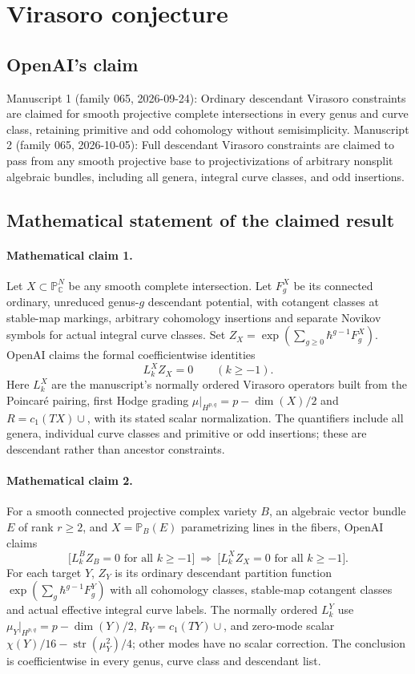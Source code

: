 \documentclass[11pt]{article}
\begin{document}
\section*{Virasoro conjecture}

\subsection{OpenAI's claim}
Manuscript 1 (family 065, 2026-09-24): Ordinary descendant Virasoro constraints are claimed for smooth projective complete intersections in every genus and curve class, retaining primitive and odd cohomology without semisimplicity. Manuscript 2 (family 065, 2026-10-05): Full descendant Virasoro constraints are claimed to pass from any smooth projective base to projectivizations of arbitrary nonsplit algebraic bundles, including all genera, integral curve classes, and odd insertions.

\subsection{Mathematical statement of the claimed result}
\paragraph{Mathematical claim 1.} Let $X\subset\mathbb P^N_{\mathbb C}$ be any smooth complete intersection. Let $F_g^X$ be its connected ordinary, unreduced genus-$g$ descendant potential, with cotangent classes at stable-map markings, arbitrary cohomology insertions and separate Novikov symbols for actual integral curve classes. Set $Z_X=\exp(\sum_{g\ge0}\hbar^{g-1}F_g^X)$. OpenAI claims the formal coefficientwise identities
\[
L_k^X Z_X=0\qquad(k\ge-1).
\]
Here $L_k^X$ are the manuscript's normally ordered Virasoro operators built from the Poincaré pairing, first Hodge grading $\mu|_{H^{p,q}}=p-\dim(X)/2$ and $R=c_1(TX)\cup$, with its stated scalar normalization. The quantifiers include all genera, individual curve classes and primitive or odd insertions; these are descendant rather than ancestor constraints.

\paragraph{Mathematical claim 2.} For a smooth connected projective complex variety $B$, an algebraic vector bundle $E$ of rank $r\ge2$, and $X=\mathbb P_B(E)$ parametrizing lines in the fibers, OpenAI claims
\[
\bigl[L_k^B Z_B=0\text{ for all }k\ge-1\bigr]\ \Longrightarrow\
\bigl[L_k^X Z_X=0\text{ for all }k\ge-1\bigr].
\]
For each target $Y$, $Z_Y$ is its ordinary descendant partition function $\exp(\sum_g\hbar^{g-1}F_g^Y)$ with all cohomology classes, stable-map cotangent classes and actual effective integral curve labels. The normally ordered $L_k^Y$ use $\mu_Y|_{H^{p,q}}=p-\dim(Y)/2$, $R_Y=c_1(TY)\cup$, and zero-mode scalar $\chi(Y)/16-\operatorname{str}(\mu_Y^2)/4$; other modes have no scalar correction. The conclusion is coefficientwise in every genus, curve class and descendant list.
\end{document}
